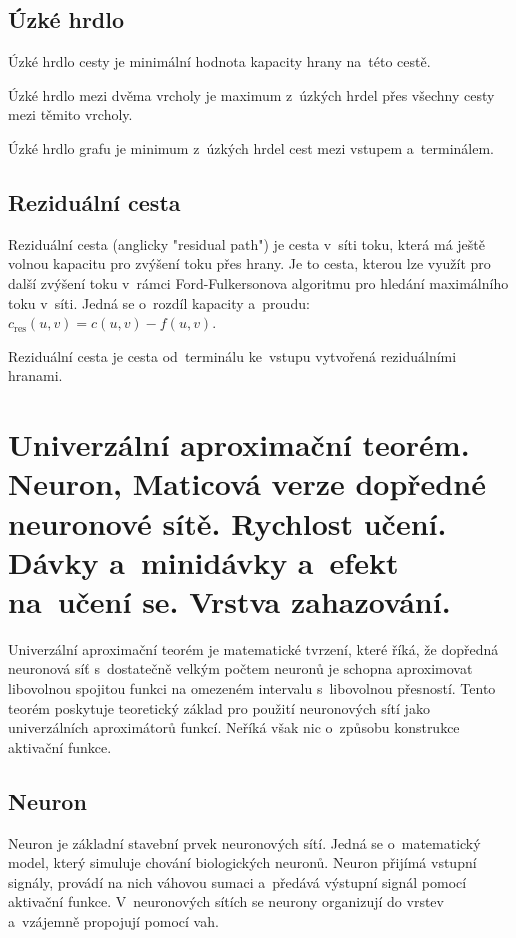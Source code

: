\subsection{Úzké hrdlo}

Úzké hrdlo cesty je minimální hodnota kapacity hrany na~této cestě.

Úzké hrdlo mezi dvěma vrcholy je maximum z~úzkých hrdel přes všechny cesty mezi těmito vrcholy.

Úzké hrdlo grafu je minimum z~úzkých hrdel cest mezi vstupem a~terminálem.

\subsection{Reziduální cesta}


Reziduální cesta (anglicky "residual path") je cesta v~síti toku, která má ještě volnou kapacitu pro zvýšení toku přes hrany. Je to cesta, kterou lze využít pro další zvýšení toku v~rámci Ford-Fulkersonova algoritmu pro hledání maximálního toku v~síti. Jedná se o~rozdíl kapacity a~proudu: $c_\mathrm{res}(u,v) = c(u,v) - f(u,v)$.

Reziduální cesta je cesta od~terminálu ke~vstupu vytvořená reziduálními hranami.

\clearpage
\section{Univerzální aproximační teorém. Neuron, Maticová verze dopředné neuronové sítě. Rychlost učení. Dávky a~minidávky a~efekt na~učení se. Vrstva zahazování.}

Univerzální aproximační teorém je matematické tvrzení, které říká, že dopředná neuronová síť s~dostatečně velkým počtem neuronů je schopna aproximovat libovolnou spojitou funkci na omezeném intervalu s~libovolnou přesností. Tento teorém poskytuje teoretický základ pro použití neuronových sítí jako univerzálních aproximátorů funkcí.
Neříká však nic o~způsobu konstrukce aktivační funkce.

\subsection{Neuron}

Neuron je základní stavební prvek neuronových sítí. Jedná se o~matematický model, který simuluje chování biologických neuronů. Neuron přijímá vstupní signály, provádí na nich váhovou sumaci a~předává výstupní signál pomocí aktivační funkce. V~neuronových sítích se neurony organizují do vrstev a~vzájemně propojují pomocí vah.

